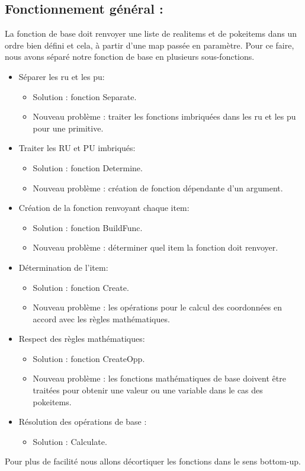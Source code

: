 

\subsection{Fonctionnement général :}
La fonction de base  doit renvoyer une liste de realitems et de pokeitems dans un ordre bien défini et cela, à partir d'une map passée en paramètre. Pour ce faire, nous avons séparé notre fonction de base en plusieurs sous-fonctions.
\begin{itemize}
    \item Séparer les ru et les pu:
    \begin{itemize}
        \item Solution : fonction Separate.
        \item Nouveau problème : traiter les fonctions imbriquées dans les ru et les pu pour une primitive. 
        \end{itemize}
    \item Traiter les RU et PU imbriqués:
    \begin{itemize}
        \item Solution : fonction Determine.
        \item Nouveau problème : création de fonction dépendante d'un argument.
    \end{itemize}
    \item Création de la fonction renvoyant chaque item:
    \begin{itemize}
        \item Solution : fonction BuildFunc.
        \item Nouveau problème : déterminer quel item la fonction doit renvoyer.
    \end{itemize}
    \item Détermination de l'item:
    \begin{itemize}
        \item Solution : fonction Create.
        \item Nouveau problème : les opérations pour le calcul des coordonnées en accord avec les règles mathématiques.
    \end{itemize}
    \item Respect des règles mathématiques:
    \begin{itemize}
        \item Solution : fonction CreateOpp.
        \item Nouveau problème : les fonctions mathématiques de base doivent être traitées pour obtenir une valeur ou une variable dans le cas des pokeitems.
    \end{itemize}
    \item Résolution des opérations de base :
    \begin{itemize}
        \item Solution : Calculate.
    \end{itemize}
\end{itemize}
Pour plus de facilité nous allons décortiquer les fonctions dans le sens bottom-up.
